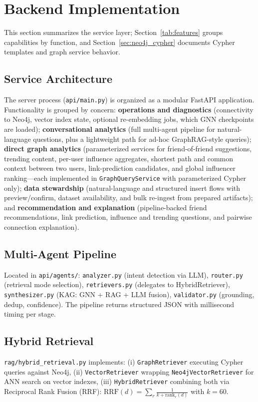 \documentclass[conference]{IEEEtran}
\begin{document}
\section{Backend Implementation}

This section summarizes the service layer; Section~\ref{tab:features} groups capabilities by function, and Section~\ref{sec:neo4j_cypher} documents Cypher templates and graph service behavior.

\subsection{Service Architecture}
The server process (\texttt{api/main.py}) is organized as a modular FastAPI application. Functionality is grouped by concern: \textbf{operations and diagnostics} (connectivity to Neo4j, vector index state, optional re-embedding jobs, which GNN checkpoints are loaded); \textbf{conversational analytics} (full multi-agent pipeline for natural-language questions, plus a lightweight path for ad-hoc GraphRAG-style queries); \textbf{direct graph analytics} (parameterized services for friend-of-friend suggestions, trending content, per-user influence aggregates, shortest path and common context between two users, link-prediction candidates, and global influencer ranking---each implemented in \texttt{GraphQueryService} with parameterized Cypher only); \textbf{data stewardship} (natural-language and structured insert flows with preview/confirm, dataset availability, and bulk re-ingest from prepared artifacts); and \textbf{recommendation and explanation} (pipeline-backed friend recommendations, link prediction, influence and trending questions, and pairwise connection explanation).

\subsection{Multi-Agent Pipeline}
Located in \texttt{api/agents/}: \texttt{analyzer.py} (intent detection via LLM), \texttt{router.py} (retrieval mode selection), \texttt{retrievers.py} (delegates to HybridRetriever), \texttt{synthesizer.py} (KAG: GNN + RAG + LLM fusion), \texttt{validator.py} (grounding, dedup, confidence). The pipeline returns structured JSON with millisecond timing per stage.

\subsection{Hybrid Retrieval}
\texttt{rag/hybrid\_retrieval.py} implements: (i) \texttt{GraphRetriever} executing Cypher queries against Neo4j, (ii) \texttt{VectorRetriever} wrapping \texttt{Neo4jVectorRetriever} for ANN search on vector indexes, (iii) \texttt{HybridRetriever} combining both via Reciprocal Rank Fusion (RRF): $\text{RRF}(d) = \sum_r \frac{1}{k + \text{rank}_r(d)}$ with $k=60$.
\end{document}
